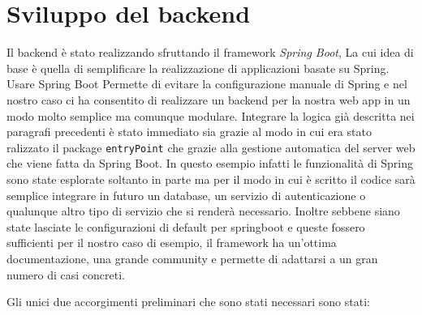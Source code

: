 \section{Sviluppo del backend}
Il backend è stato realizzando sfruttando il framework \emph{Spring Boot}\cite{springboot}, La cui idea di base è quella di semplificare la realizzazione di applicazioni basate su Spring\cite{spring}. Usare Spring Boot Permette di evitare la configurazione manuale di Spring e nel nostro caso ci ha consentito di realizzare un backend per la nostra web app in un modo molto semplice ma comunque modulare. Integrare la logica già descritta nei paragrafi precedenti è stato immediato sia grazie al modo in cui era stato ralizzato il package \texttt{entryPoint} che grazie alla gestione automatica del server web che viene fatta da Spring Boot. In questo esempio infatti le funzionalità di Spring sono state esplorate soltanto in parte ma per il modo in cui è scritto il codice sarà semplice integrare in futuro un database, un servizio di autenticazione o qualunque altro tipo di servizio che si renderà necessario. Inoltre sebbene siano state lasciate le configurazioni di default per springboot e queste fossero sufficienti per il nostro caso di esempio, il framework ha un'ottima documentazione, una grande community e permette di adattarsi a un gran numero di casi concreti.\par
Gli unici due accorgimenti preliminari che sono stati necessari sono stati:
